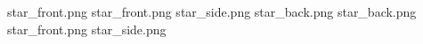 star_front.png
star_front.png
star_side.png
star_back.png
star_back.png
star_front.png
star_side.png
